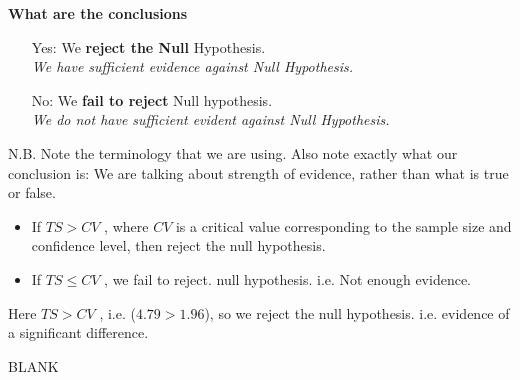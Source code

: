 \documentclass[a4paper,12pt]{article}
\begin{document}
\begin{framed}
\noindent \textbf{What are the conclusions}
\begin{itemize} 

\item[Yes:] We \textbf{reject the Null} Hypothesis. \\ \textit{We have sufficient evidence against Null Hypothesis.}

\item[No:] We \textbf{fail to reject} Null hypothesis. \\ \textit{We do not have sufficient evident against Null Hypothesis.}
\end{itemize}
{\normalsize
N.B. Note the terminology that we are using. Also note exactly what our conclusion is: We are talking about strength of evidence, rather than what is true or false.}

\end{framed}
\smallskip
\begin{framed}
\begin{itemize}
\item If $TS > CV$ , where $CV$ is a critical value corresponding to the sample size and confidence level, then reject the null hypothesis. 
\item  If $TS \leq CV$ , we fail to reject. null hypothesis. i.e. Not enough evidence. 
\end{itemize}
\end{framed}
\smallskip
\noindent Here $TS > CV$ , i.e. ($4.79 > 1.96$), so we reject the null hypothesis. i.e. evidence of a significant difference. 

\newpage
BLANK
\end{document}
